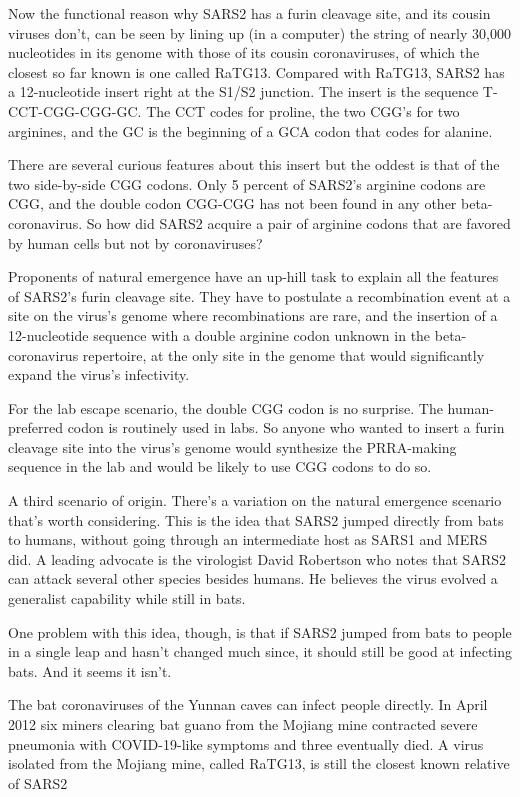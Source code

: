 \documentclass[
]{book}
\begin{document}
Now the functional reason why SARS2 has a furin cleavage site, and its cousin viruses don't, can be seen by lining up (in a computer) the string of nearly 30,000 nucleotides in its genome with those of its cousin coronaviruses, of which the closest so far known is one called RaTG13. Compared with RaTG13, SARS2 has a 12-nucleotide insert right at the S1/S2 junction. The insert is the sequence T-CCT-CGG-CGG-GC. The CCT codes for proline, the two CGG's for two arginines, and the GC is the beginning of a GCA codon that codes for alanine.

There are several curious features about this insert but the oddest is that of the two side-by-side CGG codons. Only 5 percent of SARS2's arginine codons are CGG, and the double codon CGG-CGG has not been found in any other beta-coronavirus. So how did SARS2 acquire a pair of arginine codons that are favored by human cells but not by coronaviruses?

Proponents of natural emergence have an up-hill task to explain all the features of SARS2's furin cleavage site. They have to postulate a recombination event at a site on the virus's genome where recombinations are rare, and the insertion of a 12-nucleotide sequence with a double arginine codon unknown in the beta-coronavirus repertoire, at the only site in the genome that would significantly expand the virus's infectivity.

For the lab escape scenario, the double CGG codon is no surprise. The human-preferred codon is routinely used in labs. So anyone who wanted to insert a furin cleavage site into the virus's genome would synthesize the PRRA-making sequence in the lab and would be likely to use CGG codons to do so.

A third scenario of origin. There's a variation on the natural emergence scenario that's worth considering. This is the idea that SARS2 jumped directly from bats to humans, without going through an intermediate host as SARS1 and MERS did. A leading advocate is the virologist David Robertson who notes that SARS2 can attack several other species besides humans. He believes the virus evolved a generalist capability while still in bats.

One problem with this idea, though, is that if SARS2 jumped from bats to people in a single leap and hasn't changed much since, it should still be good at infecting bats. And it seems it isn't.

The bat coronaviruses of the Yunnan caves can infect people directly. In April 2012 six miners clearing bat guano from the Mojiang mine contracted severe pneumonia with COVID-19-like symptoms and three eventually died. A virus isolated from the Mojiang mine, called RaTG13, is still the closest known relative of SARS2
\end{document}

